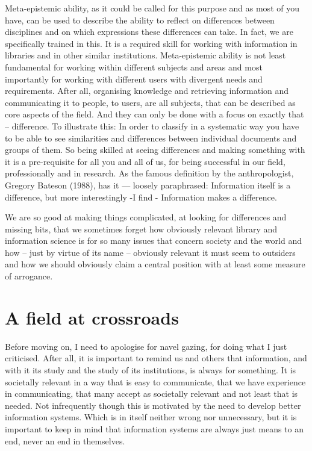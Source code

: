 ﻿\documentclass[a4paper,
fontsize=11pt,
oneside,
numbers=noperiodatend,
parskip=half-,
bibliography=totoc,
final
]{scrartcl}
\begin{document}
Meta-epistemic ability, as it could be called for this purpose and as
most of you have, can be used to describe the ability to reflect on
differences between disciplines and on which expressions these
differences can take. In fact, we are specifically trained in this. It
is a required skill for working with information in libraries and in
other similar institutions. Meta-epistemic ability is not least
fundamental for working within different subjects and areas and most
importantly for working with different users with divergent needs and
requirements. After all, organising knowledge and retrieving information
and communicating it to people, to users, are all subjects, that can be
described as core aspects of the field. And they can only be done with a
focus on exactly that -- difference. To illustrate this: In order to
classify in a systematic way you have to be able to see similarities and
differences between individual documents and groups of them. So being
skilled at seeing differences and making something with it is a
pre-requisite for all you and all of us, for being successful in our
field, professionally and in research. As the famous definition by the
anthropologist, Gregory Bateson (1988), has it --- loosely paraphrased:
Information itself is a difference, but more interestingly -I find -
Information makes a difference.

We are so good at making things complicated, at looking for differences
and missing bits, that we sometimes forget how obviously relevant
library and information science is for so many issues that concern
society and the world and how -- just by virtue of its name -- obviously
relevant it must seem to outsiders and how we should obviously claim a
central position with at least some measure of arrogance.

\section*{A field at crossroads}\label{a-field-at-crossroads}

Before moving on, I need to apologise for navel gazing, for doing what I
just criticised. After all, it is important to remind us and others that
information, and with it its study and the study of its institutions, is
always for something. It is societally relevant in a way that is easy to
communicate, that we have experience in communicating, that many accept
as societally relevant and not least that is needed. Not infrequently
though this is motivated by the need to develop better information
systems. Which is in itself neither wrong nor unnecessary, but it is
important to keep in mind that information systems are always just means
to an end, never an end in themselves.
\end{document}
